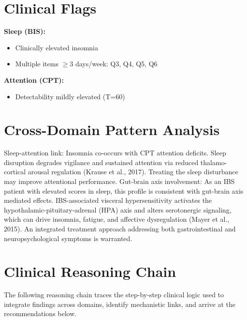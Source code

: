 \documentclass[11pt,a4paper]{article}
\begin{document}
\section{Clinical Flags}
\textbf{Sleep (BIS):}
\begin{itemize}[leftmargin=2em, topsep=0pt]
  \item Clinically elevated insomnia
  \item Multiple items $\geq$3 days/week: Q3, Q4, Q5, Q6
\end{itemize}
\textbf{Attention (CPT):}
\begin{itemize}[leftmargin=2em, topsep=0pt]
  \item Detectability mildly elevated (T=60)
\end{itemize}


\section{Cross-Domain Pattern Analysis}
Sleep-attention link: Insomnia co-occurs with CPT attention deficits. Sleep disruption degrades vigilance and sustained attention via reduced thalamo-cortical arousal regulation (Krause et al., 2017). Treating the sleep disturbance may improve attentional performance. Gut-brain axis involvement: As an IBS patient with elevated scores in sleep, this profile is consistent with gut-brain axis mediated effects. IBS-associated visceral hypersensitivity activates the hypothalamic-pituitary-adrenal (HPA) axis and alters serotonergic signaling, which can drive insomnia, fatigue, and affective dysregulation (Mayer et al., 2015). An integrated treatment approach addressing both gastrointestinal and neuropsychological symptoms is warranted.

\section{Clinical Reasoning Chain}

The following reasoning chain traces the step-by-step clinical logic used to integrate findings across domains, identify mechanistic links, and arrive at the recommendations below.
\end{document}
